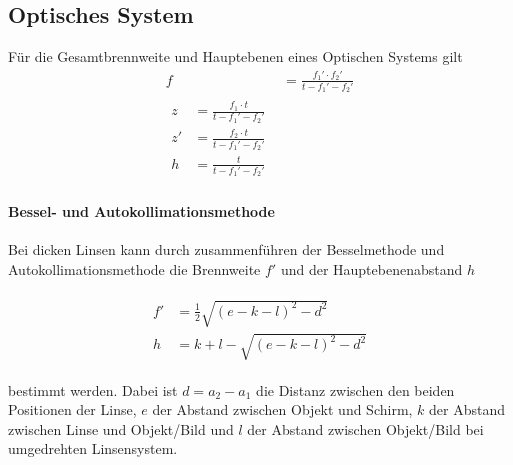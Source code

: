 \documentclass[11pt, a4paper]{article}
\begin{document}
    \subsection{Optisches System}

    Für die Gesamtbrennweite und Hauptebenen eines Optischen Systems gilt
    \begin{align}
        f &= \frac{f_1' \cdot f_2'}{t - f_1' - f_2'} \label{eq:brenn}\\ 
        \begin{split} \label{eq:ebene}
           z &= \frac{f_1 \cdot t}{t - f_1' - f_2'}  \\
           z' &= \frac{f_2 \cdot t}{t - f_1' - f_2'} \\
           h &= \frac{t}{t - f_1' - f_2'}
        \end{split}
    \end{align}

    \paragraph{Bessel- und Autokollimationsmethode}
    Bei dicken Linsen kann durch zusammenführen der Besselmethode und Autokollimationsmethode die Brennweite $f'$ und der Hauptebenenabstand $h$
    
    \begin{align} \begin{split} \label{eq:dicke}
        f' &= \frac{1}{2} \sqrt{(e-k-l)^2 - d^2} \\
        h &= k + l - \sqrt{(e-k-l)^2 - d^2} \end{split}
    \end{align}
        
    bestimmt werden. Dabei ist $d = a_2 - a_1$ die Distanz zwischen den beiden Positionen der Linse, $e$ der Abstand zwischen Objekt und Schirm, $k$ der Abstand zwischen Linse und Objekt/Bild und $l$ der Abstand zwischen Objekt/Bild bei umgedrehten Linsensystem.
\end{document}
